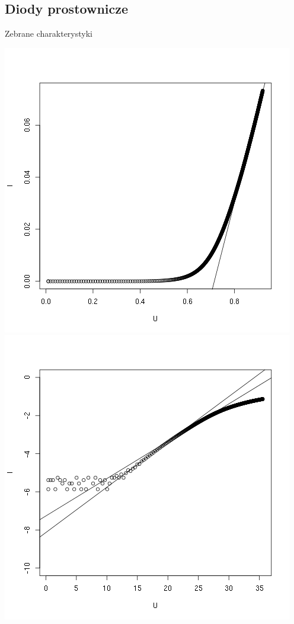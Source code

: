 \documentclass[11pt]{article}
\begin{document}
\subsection{Diody prostownicze}
Zebrane charakterystyki
\begin{multicols}{2}
\includegraphics[scale=0.35]{out/prostownicza-normal.png}
\columnbreak
\includegraphics[scale=0.35]{out/prostownicza-log.png}
\end{multicols}
\end{document}
